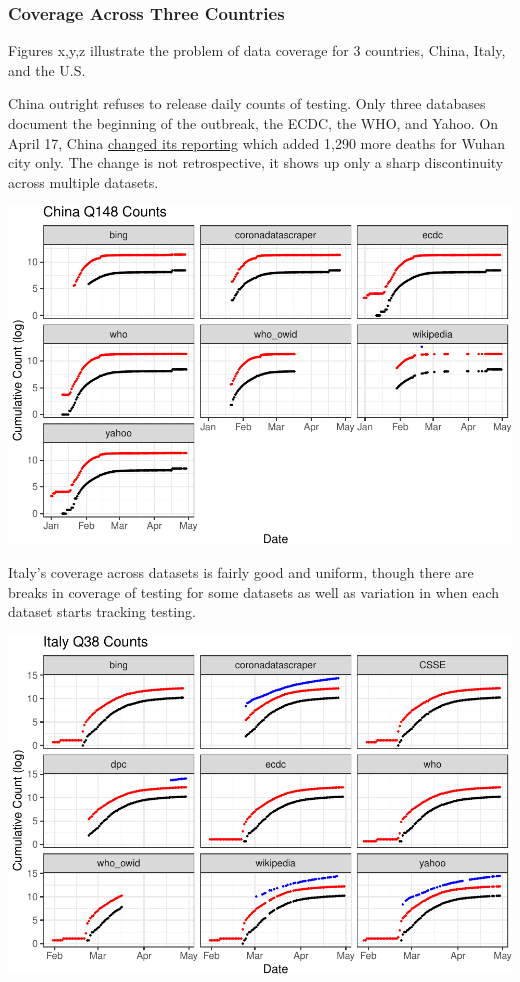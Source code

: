 \documentclass[
]{book}
\begin{document}
\hypertarget{coverage-across-three-countries}{%
\subsubsection{Coverage Across Three Countries}\label{coverage-across-three-countries}}

Figures x,y,z illustrate the problem of data coverage for 3 countries, China, Italy, and the U.S.

China outright refuses to release daily counts of testing. Only three databases document the beginning of the outbreak, the ECDC, the WHO, and Yahoo. On April 17, China \href{http://en.nhc.gov.cn/2020-04/17/c_79285.htm}{changed its reporting} which added 1,290 more deaths for Wuhan city only. The change is not retrospective, it shows up only a sharp discontinuity across multiple datasets.

\begin{center}\includegraphics[width=1\linewidth]{HowToBeCarefulWithCovid19Counts_files/figure-latex/p_over_time_by_source_china1-1} \end{center}

Italy's coverage across datasets is fairly good and uniform, though there are breaks in coverage of testing for some datasets as well as variation in when each dataset starts tracking testing.

\begin{center}\includegraphics[width=1\linewidth]{HowToBeCarefulWithCovid19Counts_files/figure-latex/p_over_time_by_source_italy1-1} \end{center}
\end{document}
